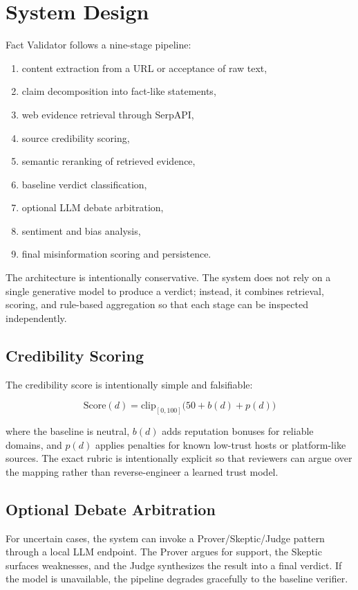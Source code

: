 \documentclass[11pt,a4paper]{article}
\begin{document}
\section{System Design}

Fact Validator follows a nine-stage pipeline:

\begin{enumerate}
  \item content extraction from a URL or acceptance of raw text,
  \item claim decomposition into fact-like statements,
  \item web evidence retrieval through SerpAPI,
  \item source credibility scoring,
  \item semantic reranking of retrieved evidence,
  \item baseline verdict classification,
  \item optional LLM debate arbitration,
  \item sentiment and bias analysis,
  \item final misinformation scoring and persistence.
\end{enumerate}

The architecture is intentionally conservative. The system does not rely on a single generative model to produce a verdict; instead, it combines retrieval, scoring, and rule-based aggregation so that each stage can be inspected independently.

\subsection{Credibility Scoring}

The credibility score is intentionally simple and falsifiable:

\[
\mathrm{Score}(d) = \mathrm{clip}_{[0,100]}\bigl(50 + b(d) + p(d)\bigr)
\]

where the baseline is neutral, $b(d)$ adds reputation bonuses for reliable domains, and $p(d)$ applies penalties for known low-trust hosts or platform-like sources. The exact rubric is intentionally explicit so that reviewers can argue over the mapping rather than reverse-engineer a learned trust model.

\subsection{Optional Debate Arbitration}

For uncertain cases, the system can invoke a Prover/Skeptic/Judge pattern through a local LLM endpoint. The Prover argues for support, the Skeptic surfaces weaknesses, and the Judge synthesizes the result into a final verdict. If the model is unavailable, the pipeline degrades gracefully to the baseline verifier.
\end{document}
